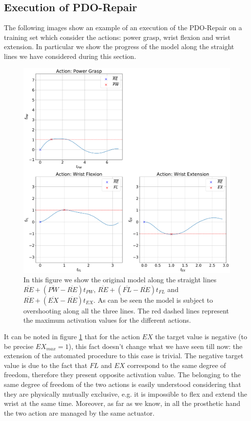\subsection{Execution of PDO-Repair}\label{subsec:PDO-Repair}
The following images show an example of an execution of the PDO-Repair on a training set which consider the actions: power grasp, wrist flexion and wrist extension. In particular we show the progress of the model along the straight lines we have considered during this section.
\begin{figure}[ht]
    \centering
    \includegraphics[width=\textwidth]{Images/repair-example/PDO-State0.pdf}
    \caption{In this figure we show the original model along the straight lines $\overline{RE} + (\overline{PW} - \overline{RE})t_{PW}$, $\overline{RE} + (\overline{FL} - \overline{RE})t_{FL}$ and $\overline{RE} + (\overline{EX} - \overline{RE})t_{EX}$. As can be seen the model is subject to overshooting along all the three lines. The red dashed lines represent the maximum activation values for the different actions.}
    \label{fig:PDO-exec-0}
\end{figure}
It can be noted in figure \ref{fig:PDO-exec-0} that for the action $EX$ the target value is negative (to be precise $EX_{max} = 1$), this fact doesn't change what we have seen till now: the extension of the automated procedure to this case is trivial. The negative target value is due to the fact that $FL$ and $EX$ correspond to the same degree of freedom, therefore they present opposite activation value. The belonging to the same degree of freedom of the two actions is easily understood considering that they are physically mutually exclusive, e.g. it is impossible to flex and extend the wrist at the same time. Moreover, as far as we know, in all the prosthetic hand the two action are managed by the same actuator.
